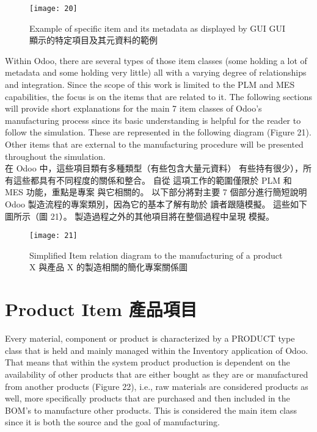 \begin{figure}[hbt!]
\begin{center}
\texttt{[image: 20]}
\caption{\Large Example of specific item and its metadata as displayed by GUI GUI 顯示的特定項目及其元資料的範例}\label{fig.20}
\end{center}
\end{figure}


\fontsize{12}{2.5pt}\sectionef 
 {Within Odoo, there are several types of those item classes (some holding a lot of metadata
and some holding very little) all with a varying degree of relationships and integration. Since
the scope of this work is limited to the PLM and MES capabilities, the focus is on the items
that are related to it. The following sections will provide short explanations for the main 7
item classes of Odoo’s manufacturing process since its basic understanding is helpful for the
reader to follow the simulation. These are represented in the following diagram (Figure 21).
Other items that are external to the manufacturing procedure will be presented throughout
the simulation.}\\[1pt]

\fontsize{12}{2.5pt}\sectionef  
{在 Odoo 中，這些項目類有多種類型（有些包含大量元資料）
有些持有很少），所有這些都具有不同程度的關係和整合。 自從
這項工作的範圍僅限於 PLM 和 MES 功能，重點是專案
與它相關的。 以下部分將對主要 7 個部分進行簡短說明
Odoo 製造流程的專案類別，因為它的基本了解有助於
讀者跟隨模擬。 這些如下圖所示（圖 21）。
製造過程之外的其他項目將在整個過程中呈現
模擬。}\\[15pt]


\begin{figure}[hbt!]
\begin{center}
\texttt{[image: 21]}
\caption{\Large Simplified Item relation diagram to the manufacturing of a product X  與產品 X 的製造相關的簡化專案關係圖}\label{fig.21}
\end{center}
\end{figure}



\section{Product Item 產品項目 }

\fontsize{12}{2.5pt}\sectionef 
 {Every material, component or product is characterized by a PRODUCT type class that is
held and mainly managed within the Inventory application of Odoo. That means that within
the system product production is dependent on the availability of other products that are
either bought as they are or manufactured from another products (Figure 22), i.e., raw
materials are considered products as well, more specifically products that are purchased and
then included in the BOM’s to manufacture other products. This is considered the main item
class since it is both the source and the goal of manufacturing.
}\\[1pt]

